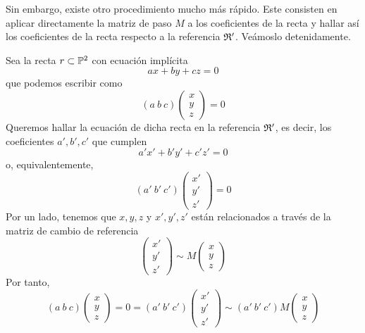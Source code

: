 Sin embargo, existe otro procedimiento mucho más rápido. Este consisten en aplicar directamente la matriz de paso $M$ a los coeficientes de la recta y hallar así los coeficientes de la recta respecto a la referencia $\mathfrak{R}'$. Veámoslo detenidamente.

Sea la recta $r\subset\mathbb{P}^2$ con ecuación implícita
\begin{equation*}
	ax+by+cz=0
\end{equation*}
que podemos escribir como
\begin{equation*}
(a \ b \ c)\left( \begin{array}{c}
x\\
y\\
z
\end{array}\right) =0
\end{equation*}
Queremos hallar la ecuación de dicha recta en la referencia $\mathfrak{R}'$, es decir, los coeficientes $a',b',c'$ que cumplen
\begin{equation*}
	a'x'+b'y'+c'z'=0
\end{equation*}
o, equivalentemente,
\begin{equation*}
	(a' \ b' \ c')\left( \begin{array}{c}
		x'\\
		y'\\
		z'
	\end{array}\right) =0
\end{equation*}
Por un lado, tenemos que $x,y,z$ y $x',y',z'$ están relacionados a través de la matriz de cambio de referencia
\begin{equation*}
	\left( \begin{array}{c}
	x'\\
	y'\\
	z'
	\end{array}\right)\sim M 
	\left( \begin{array}{c}
		x\\
		y\\
		z
	\end{array}\right)
\end{equation*}
Por tanto, 
\begin{equation*}
	(a \ b \ c)\left( \begin{array}{c}
		x\\
		y\\
		z
	\end{array}\right) =0=(a' \ b' \ c')\left( \begin{array}{c}
		x'\\
		y'\\
		z'
	\end{array}\right)\sim(a' \ b' \ c')M 
	\left( \begin{array}{c}
		x\\
		y\\
		z
	\end{array}\right)
\end{equation*}
